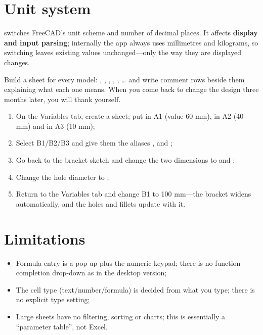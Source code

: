 \section{Unit system}

 switches FreeCAD's unit scheme and number of decimal places.
It affects \textbf{display and input parsing}; internally the app always uses millimetres and kilograms,
so switching leaves existing values unchanged---only the way they are displayed changes.

\begin{tip}
Build a sheet for every model: , , , ,
, \ldots{} and write comment rows beside them explaining what each one means. When you
come back to change the design three months later, you will thank yourself.
\end{tip}

\begin{practice}
\begin{enumerate}
  \item On the Variables tab, create a sheet; put  in A1 (value 60 mm),  in A2
        (40 mm) and  in A3 (10 mm);
  \item Select B1/B2/B3 and give them the aliases ,  and ;
  \item Go back to the bracket sketch and change the two dimensions to  and
        ;
  \item Change the hole diameter to ;
  \item Return to the Variables tab and change B1 to 100 mm---the bracket widens automatically, and the
        holes and fillets update with it.
\end{enumerate}
\end{practice}

\section{Limitations}

\begin{itemize}
  \item Formula entry is a pop-up plus the numeric keypad; there is no function-completion drop-down as in
        the desktop version;
  \item The cell type (text/number/formula) is decided from what you type; there is no explicit type
        setting;
  \item Large sheets have no filtering, sorting or charts; this is essentially a ``parameter table'', not
        Excel.
\end{itemize}
